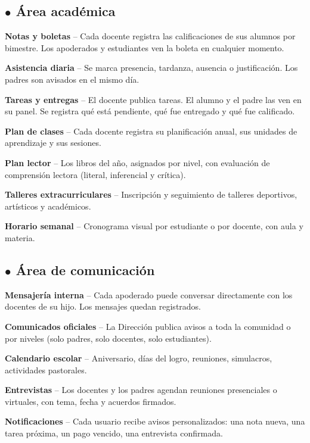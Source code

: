 \documentclass[11pt,a4paper]{article}
\begin{document}
\subsection*{\textcolor{merBlue}{$\bullet$} Área académica}
\begin{plainbox}
\textbf{Notas y boletas} -- Cada docente registra las calificaciones de sus alumnos por bimestre. Los apoderados y estudiantes ven la boleta en cualquier momento.

\textbf{Asistencia diaria} -- Se marca presencia, tardanza, ausencia o justificación. Los padres son avisados en el mismo día.

\textbf{Tareas y entregas} -- El docente publica tareas. El alumno y el padre las ven en su panel. Se registra qué está pendiente, qué fue entregado y qué fue calificado.

\textbf{Plan de clases} -- Cada docente registra su planificación anual, sus unidades de aprendizaje y sus sesiones.

\textbf{Plan lector} -- Los libros del año, asignados por nivel, con evaluación de comprensión lectora (literal, inferencial y crítica).

\textbf{Talleres extracurriculares} -- Inscripción y seguimiento de talleres deportivos, artísticos y académicos.

\textbf{Horario semanal} -- Cronograma visual por estudiante o por docente, con aula y materia.
\end{plainbox}

\subsection*{\textcolor{merBlue}{$\bullet$} Área de comunicación}
\begin{plainbox}
\textbf{Mensajería interna} -- Cada apoderado puede conversar directamente con los docentes de su hijo. Los mensajes quedan registrados.

\textbf{Comunicados oficiales} -- La Dirección publica avisos a toda la comunidad o por niveles (solo padres, solo docentes, solo estudiantes).

\textbf{Calendario escolar} -- Aniversario, días del logro, reuniones, simulacros, actividades pastorales.

\textbf{Entrevistas} -- Los docentes y los padres agendan reuniones presenciales o virtuales, con tema, fecha y acuerdos firmados.

\textbf{Notificaciones} -- Cada usuario recibe avisos personalizados: una nota nueva, una tarea próxima, un pago vencido, una entrevista confirmada.
\end{plainbox}
\end{document}
